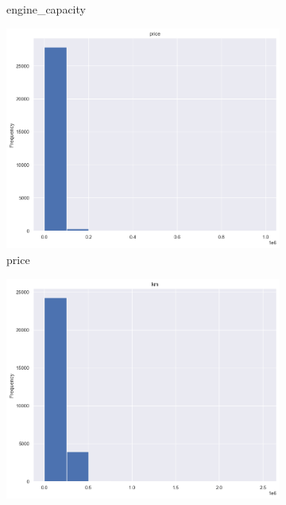 \begin{figure}[ht]
\begin{subfigure}[b]{0.32\linewidth}
        \caption{engine\_capacity}
        \label{fig:engine_capacity}
    \end{subfigure}
    \hfill
    \begin{subfigure}[b]{0.32\linewidth}
        \centering
        \includegraphics[width=\linewidth]{images/priceprediction/outliers/price.png}
        \caption{price}
        \label{fig:price}
    \end{subfigure}
    \vfill
    \begin{subfigure}[b]{0.48\linewidth}
        \centering
        \includegraphics[width=\linewidth]{images/priceprediction/outliers/km.png}

\end{subfigure}
\end{figure}
